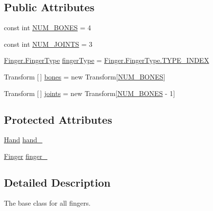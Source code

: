 \subsection*{Public Attributes}
\begin{DoxyCompactItemize}
\item 
const int \mbox{\hyperlink{class_leap_1_1_unity_1_1_finger_model_a35043ac951361f61a591a5a69083ab8c}{N\+U\+M\+\_\+\+B\+O\+N\+ES}} = 4
\item 
const int \mbox{\hyperlink{class_leap_1_1_unity_1_1_finger_model_a7c3698c9580cdab983d5273b88c6d288}{N\+U\+M\+\_\+\+J\+O\+I\+N\+TS}} = 3
\item 
\mbox{\hyperlink{class_leap_1_1_finger_ae75e8d46a01aff0bd5c6d6fb99e2f2ba}{Finger.\+Finger\+Type}} \mbox{\hyperlink{class_leap_1_1_unity_1_1_finger_model_a21c5f56f4dd6fba09212d1738811eecb}{finger\+Type}} = \mbox{\hyperlink{class_leap_1_1_finger_ae75e8d46a01aff0bd5c6d6fb99e2f2baae935a2bcf041187b5d3530f6084c5914}{Finger.\+Finger\+Type.\+T\+Y\+P\+E\+\_\+\+I\+N\+D\+EX}}
\item 
Transform \mbox{[}$\,$\mbox{]} \mbox{\hyperlink{class_leap_1_1_unity_1_1_finger_model_a9dc2230af982027edd82f9952a1267a6}{bones}} = new Transform\mbox{[}\mbox{\hyperlink{class_leap_1_1_unity_1_1_finger_model_a35043ac951361f61a591a5a69083ab8c}{N\+U\+M\+\_\+\+B\+O\+N\+ES}}\mbox{]}
\item 
Transform \mbox{[}$\,$\mbox{]} \mbox{\hyperlink{class_leap_1_1_unity_1_1_finger_model_ac4bafebe19d4651bf35e95a52288aa24}{joints}} = new Transform\mbox{[}\mbox{\hyperlink{class_leap_1_1_unity_1_1_finger_model_a35043ac951361f61a591a5a69083ab8c}{N\+U\+M\+\_\+\+B\+O\+N\+ES}} -\/ 1\mbox{]}
\end{DoxyCompactItemize}
\subsection*{Protected Attributes}
\begin{DoxyCompactItemize}
\item 
\mbox{\hyperlink{class_leap_1_1_hand}{Hand}} \mbox{\hyperlink{class_leap_1_1_unity_1_1_finger_model_a2157942a6279b6457c632ce5024e8f27}{hand\+\_\+}}
\item 
\mbox{\hyperlink{class_leap_1_1_finger}{Finger}} \mbox{\hyperlink{class_leap_1_1_unity_1_1_finger_model_a8b4b5c124b754ee09e0b032618f7e666}{finger\+\_\+}}
\end{DoxyCompactItemize}


\subsection{Detailed Description}
The base class for all fingers.

